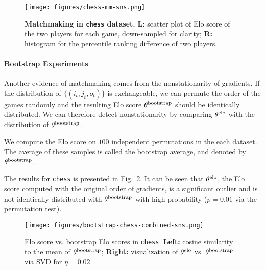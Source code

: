\begin{figure}[ht]
    \centering
    \texttt{[image: figures/chess-mm-sns.png]}
    \caption{\textbf{Matchmaking in \texttt{chess} dataset.} \textbf{L:} scatter plot of Elo score of the two players for each game, down-sampled for clarity; \textbf{R:} histogram for the percentile ranking difference of two players.}
    \label{fig:chess-mm}
\end{figure}




\paragraph{Bootstrap Experiments} Another evidence of matchmaking comes from the nonstationarity of gradients. If the distribution of $\{(i_t,j_t,o_t)\}$ is exchangeable, we can permute the order of the games randomly and the resulting Elo score $\theta^{\rm bootstrap}$ should be identically distributed. We can therefore detect nonstationarity by comparing $\theta^{\rm elo}$ with the distribution of $\theta^{\rm bootstrap}$. 

We compute the Elo score on $100$ independent permutations in the each dataset. The average of these samples is called the bootstrap average, and denoted by $\bar{\theta}^{\rm bootstrap}$.

The results for \texttt{chess} is presented in Fig.~\ref{fig:chess-bootstrap}. It can be seen that $\theta^{\rm elo}$, the Elo score computed with the original order of gradients, is a significant outlier and is not identically distributed with $\theta^{\rm bootstrap}$ with high probability ($p=0.01$ via the permutation test).

\begin{figure}[h]
    \centering
    \texttt{[image: figures/bootstrap-chess-combined-sns.png]}
    \caption{Elo score vs. bootstrap Elo scores in \texttt{chess}. \textbf{Left:} cosine similarity to the mean of $\theta^{\rm bootstrap}$; \textbf{Right:} visualization of $\theta^{\rm elo}$ vs. $\theta^{\rm bootstrap}$ via SVD for $\eta=0.02$.}
    \label{fig:chess-bootstrap}
\end{figure}

